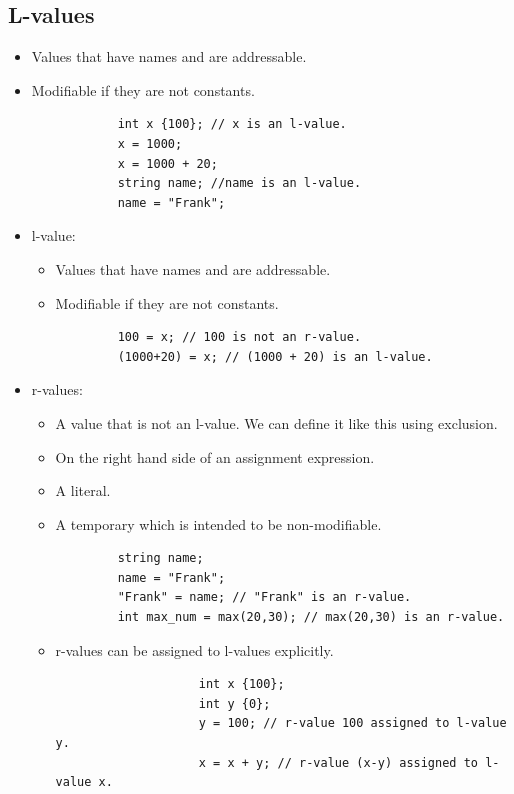 \subsection{L-values}
\begin{itemize}
    \item Values that have names and are addressable.
    \item Modifiable if they are not constants.
        \begin{verbatim}
            int x {100}; // x is an l-value.
            x = 1000;
            x = 1000 + 20;
            string name; //name is an l-value.
            name = "Frank";
        \end{verbatim}
    
    \item l-value:
        \begin{itemize}
            \item Values that have names and are addressable.
            \item Modifiable if they are not constants. 
        \end{itemize}
        \begin{verbatim}
            100 = x; // 100 is not an r-value.
            (1000+20) = x; // (1000 + 20) is an l-value.
        \end{verbatim}
    
    \item r-values:
        \begin{itemize}
            \item A value that is not an l-value. We can define it like this using exclusion.
            \item On the right hand side of an assignment expression.
            \item A literal.
            \item A temporary which is intended to be non-modifiable.
        \end{itemize}
        \begin{verbatim}
            string name; 
            name = "Frank";
            "Frank" = name; // "Frank" is an r-value.
            int max_num = max(20,30); // max(20,30) is an r-value.
        \end{verbatim}
        \begin{itemize}
            \item r-values can be assigned to l-values explicitly.
                \begin{verbatim}
                    int x {100};
                    int y {0};
                    y = 100; // r-value 100 assigned to l-value y.
                    x = x + y; // r-value (x-y) assigned to l-value x.
                \end{verbatim}
        \end{itemize}
    

\end{itemize}
